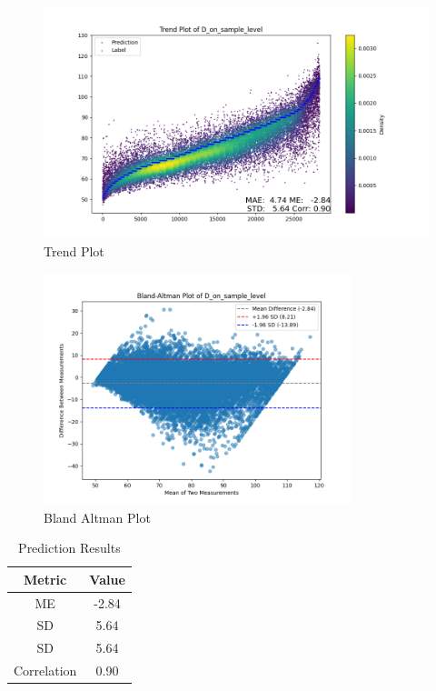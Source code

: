 \documentclass{article}
\begin{document}
\begin{figure}[H]
\centering
\includegraphics[width=\textwidth]{./Fig/Trend_Plot_D_on_sample_level.png}
\caption{Trend Plot}
\label{fig:image1}
\end{figure}

\begin{figure}[H]
\centering
\includegraphics[width=0.8\textwidth]{./Fig/Bland_Altman_Plot_D_on_sample_level.png}
\caption{Bland Altman Plot}
\label{fig:image2}
\end{figure}

\begin{table}[h!]
\centering
\begin{tabular}{|c|c|}
\hline
Metric & Value \\ \hline
ME & -2.84 \\ \hline
SD & 5.64 \\ \hline
SD & 5.64 \\ \hline
Correlation & 0.90 \\ \hline

\end{tabular}
\caption{Prediction Results}
\label{tab:metrics}
\end{table}
\end{document}
